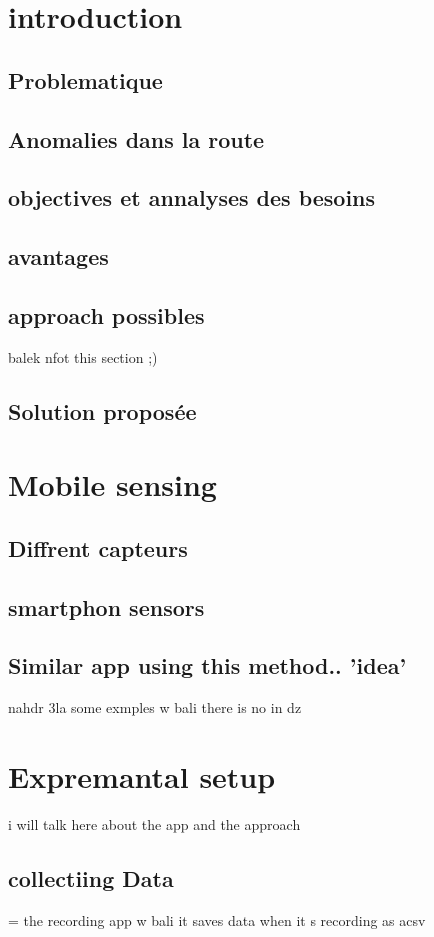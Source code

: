 

\chapter{introduction}
\section{Problematique}
\section{Anomalies dans la route}
\section{objectives et annalyses des besoins}
\section{avantages}
\section{approach possibles} 
balek nfot this section ;) 
\section{Solution proposée}

\chapter{Mobile sensing}
\section{Diffrent capteurs}
\section{smartphon sensors}
\section{Similar app using this method.. 'idea'}
nahdr 3la some exmples w bali there is no in dz 

\chapter{Expremantal setup}
i will talk here about the app and the approach
\section{collectiing Data}
= the recording app w bali it saves data when it s recording as acsv
